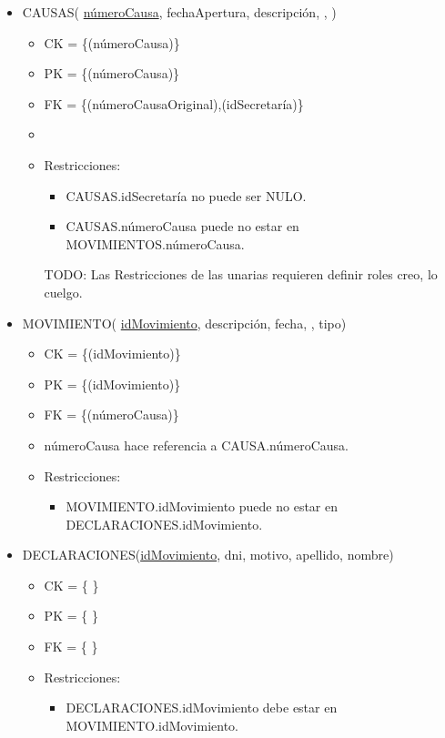 \begin{itemize}
	
\item CAUSAS( \underline{númeroCausa}, fechaApertura, descripción, , )
	\begin{itemize}
		\item CK = \{(númeroCausa)\}
		\item PK = \{(númeroCausa)\}
		\item FK = \{(númeroCausaOriginal),(idSecretaría)\}
		\item 
		\item Restricciones:
			\begin{itemize}
			\item CAUSAS.idSecretaría no puede ser NULO.
			\item CAUSAS.númeroCausa puede no estar en MOVIMIENTOS.númeroCausa.
			\\
			\end{itemize}
			TODO: Las Restricciones de las unarias requieren definir roles creo, lo cuelgo.
	\end{itemize}

	
\item MOVIMIENTO( \underline{idMovimiento}, descripción, fecha, , tipo)
	\begin{itemize}
		\item CK = \{(idMovimiento)\}
		\item PK = \{(idMovimiento)\}
		\item FK = \{(númeroCausa)\}
		\item númeroCausa hace referencia a CAUSA.númeroCausa.
		\item Restricciones:
			\begin{itemize}
			\item MOVIMIENTO.idMovimiento puede no estar en DECLARACIONES.idMovimiento.
			\\
			\end{itemize}
	\end{itemize} 
	
\item DECLARACIONES(\underline{idMovimiento}, dni, motivo, apellido, nombre)
	\begin{itemize}
		\item CK = \{ \}
		\item PK = \{ \}
		\item FK = \{ \}
		\item Restricciones:
			\begin{itemize}
			\item DECLARACIONES.idMovimiento debe estar en MOVIMIENTO.idMovimiento.
			\\
			\end{itemize}
	\end{itemize}
	
	
\end{itemize}		